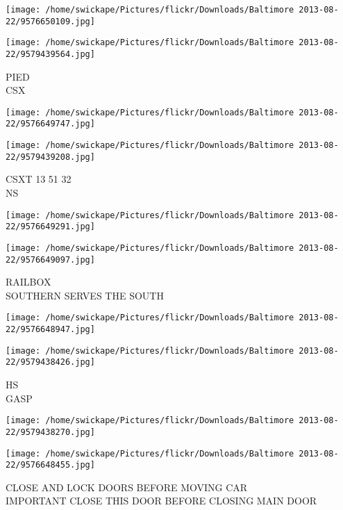 \documentclass[10pt,letterpaper]{article}
\begin{document}
\texttt{[image: /home/swickape/Pictures/flickr/Downloads/Baltimore 2013-08-22/9576650109.jpg]}

\vspace{0.25in}
\texttt{[image: /home/swickape/Pictures/flickr/Downloads/Baltimore 2013-08-22/9579439564.jpg]}

PIED\\
CSX\\
\pagebreak

\texttt{[image: /home/swickape/Pictures/flickr/Downloads/Baltimore 2013-08-22/9576649747.jpg]}

\vspace{0.25in}
\texttt{[image: /home/swickape/Pictures/flickr/Downloads/Baltimore 2013-08-22/9579439208.jpg]}

CSXT 13 51 32\\
NS\\
\pagebreak

\texttt{[image: /home/swickape/Pictures/flickr/Downloads/Baltimore 2013-08-22/9576649291.jpg]}

\vspace{0.25in}
\texttt{[image: /home/swickape/Pictures/flickr/Downloads/Baltimore 2013-08-22/9576649097.jpg]}

RAILBOX\\
SOUTHERN SERVES THE SOUTH\\
\pagebreak

\texttt{[image: /home/swickape/Pictures/flickr/Downloads/Baltimore 2013-08-22/9576648947.jpg]}

\vspace{0.25in}
\texttt{[image: /home/swickape/Pictures/flickr/Downloads/Baltimore 2013-08-22/9579438426.jpg]}

HS\\
GASP\\
\pagebreak

\texttt{[image: /home/swickape/Pictures/flickr/Downloads/Baltimore 2013-08-22/9579438270.jpg]}

\vspace{0.25in}
\texttt{[image: /home/swickape/Pictures/flickr/Downloads/Baltimore 2013-08-22/9576648455.jpg]}

CLOSE AND LOCK DOORS BEFORE MOVING CAR\\
IMPORTANT CLOSE THIS DOOR BEFORE CLOSING MAIN DOOR\\
\pagebreak
\end{document}
